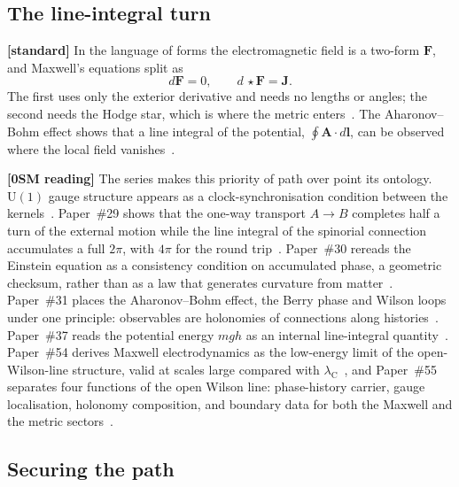 \documentclass[%
 reprint, amsmath,amssymb, aps, prb, ]{revtex4-2}
\numberwithin{equation}{section}
\newcommand{\lambdaC}{\lambda_{\text{C}}}
\newcommand{\FF}{\mathbf{F}}
\newcommand{\hodge}{\star}
\begin{document}
\subsection{The line-integral turn}

\textbf{[standard]} In the language of forms the electromagnetic field is a two-form $\FF$, and Maxwell's equations split as
\begin{equation}
d\FF = 0, \qquad d\,{\hodge}\FF = \mathbf J .
\label{eq:maxwell}
\end{equation}
The first uses only the exterior derivative and needs no lengths or angles; the second needs the Hodge star, which is where the metric enters~\cite{HehlObukhov2003}. The Aharonov--Bohm effect shows that a line integral of the potential, $\oint\mathbf A\cdot d\mathbf l$, can be observed where the local field vanishes~\cite{AharonovBohm1959}.

\textbf{[0SM reading]} The series makes this priority of path over point its ontology. $\mathrm{U}(1)$ gauge structure appears as a clock-synchronisation condition between the kernels~\cite{hanamura17}. Paper~\#29 shows that the one-way transport $A\to B$ completes half a turn of the external motion while the line integral of the spinorial connection accumulates a full $2\pi$, with $4\pi$ for the round trip~\cite{hanamura29}. Paper~\#30 rereads the Einstein equation as a consistency condition on accumulated phase, a geometric checksum, rather than as a law that generates curvature from matter~\cite{hanamura30}. Paper~\#31 places the Aharonov--Bohm effect, the Berry phase and Wilson loops under one principle: observables are holonomies of connections along histories~\cite{hanamura31}. Paper~\#37 reads the potential energy $mgh$ as an internal line-integral quantity~\cite{hanamura37}. Paper~\#54 derives Maxwell electrodynamics as the low-energy limit of the open-Wilson-line structure, valid at scales large compared with $\lambdaC$~\cite{hanamura54}, and Paper~\#55 separates four functions of the open Wilson line: phase-history carrier, gauge localisation, holonomy composition, and boundary data for both the Maxwell and the metric sectors~\cite{hanamura55}.

\subsection{Securing the path}
\end{document}

